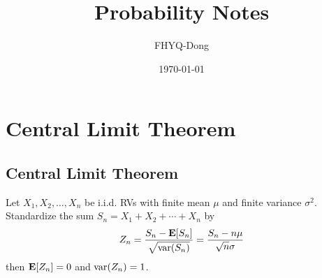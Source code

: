 \documentclass[device=normal, lang=en]{elegantbook}
\title{Probability Notes}
\author{FHYQ-Dong}
\date{\today}
\numberwithin{equation}{section}
\begin{document}
\maketitle
\frontmatter

\tableofcontents
\mainmatter















\chapter{Central Limit Theorem}

\section{Central Limit Theorem}
Let $X_1, X_2, \ldots, X_n$ be i.i.d. RVs with finite mean $\mu$ and finite variance $\sigma^2$. Standardize the sum $S_n = X_1 + X_2 + \cdots + X_n$ by
\begin{equation}
    Z_n = \frac{S_n - \mathbf{E}[S_n]}{\sqrt{\mathrm{var}(S_n)}} = \frac{S_n - n\mu}{\sqrt{n}\sigma}
\end{equation}
then $\mathbf{E}[Z_n] = 0$ and $\mathrm{var}(Z_n) = 1$. 
\end{document}
